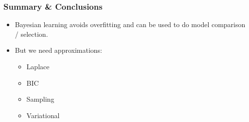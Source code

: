 \begin{frame}
\frametitle{Summary \& Conclusions}

\begin{itemize} 
\item Bayesian learning avoids overfitting and can be
used to do model comparison / selection. \vspace*{-0.2ex} 
\item But we need approximations: 
\begin{itemize}
\item Laplace
\item BIC
\item Sampling
\item Variational
\end{itemize}
\end{itemize}

\end{frame}






\usepackage{amssymb}

